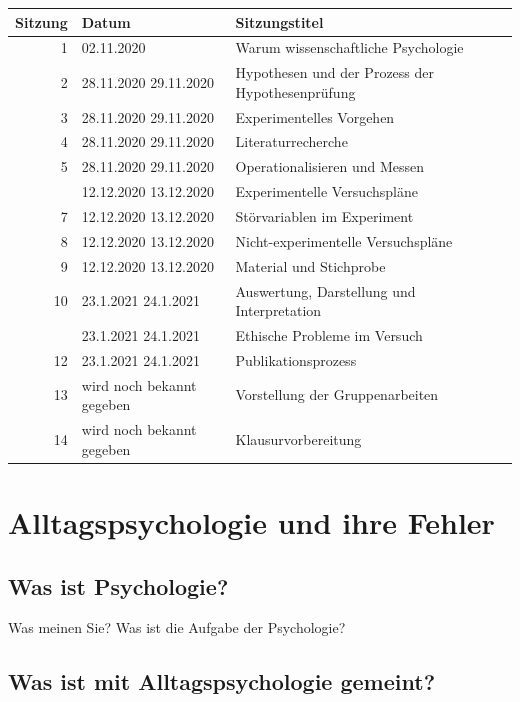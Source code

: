 \documentclass[
]{book}
\begin{document}
\begin{tabular}[t]{rll}
\toprule
Sitzung & Datum & Sitzungstitel\\
\midrule
1 & 02.11.2020 & Warum wissenschaftliche Psychologie\\
2 & 28.11.2020
29.11.2020 & Hypothesen und der Prozess der Hypothesenprüfung\\
3 & 28.11.2020
29.11.2020 & Experimentelles Vorgehen\\
4 & 28.11.2020
29.11.2020 & Literaturrecherche\\
5 & 28.11.2020
29.11.2020 & Operationalisieren und Messen\\
\addlinespace
6 & 12.12.2020
13.12.2020 & Experimentelle Versuchspläne\\
7 & 12.12.2020
13.12.2020 & Störvariablen im Experiment\\
8 & 12.12.2020
13.12.2020 & Nicht-experimentelle Versuchspläne\\
9 & 12.12.2020
13.12.2020 & Material und Stichprobe\\
10 & 23.1.2021
24.1.2021 & Auswertung, Darstellung und Interpretation\\
\addlinespace
11 & 23.1.2021
24.1.2021 & Ethische Probleme im Versuch\\
12 & 23.1.2021
24.1.2021 & Publikationsprozess\\
13 & wird noch bekannt gegeben & Vorstellung der Gruppenarbeiten\\
14 & wird noch bekannt gegeben & Klausurvorbereitung\\
\bottomrule
\end{tabular}

\hypertarget{alltagspsychologie-und-ihre-fehler}{%
\section{Alltagspsychologie und ihre Fehler}\label{alltagspsychologie-und-ihre-fehler}}

\hypertarget{was-ist-psychologie}{%
\subsection{Was ist Psychologie?}\label{was-ist-psychologie}}

Was meinen Sie?
Was ist die Aufgabe der Psychologie?

\hypertarget{was-ist-mit-alltagspsychologie-gemeint}{%
\subsection{Was ist mit Alltagspsychologie gemeint?}\label{was-ist-mit-alltagspsychologie-gemeint}}
\end{document}

